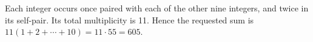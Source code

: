 Each integer occurs once paired with each of the other nine integers, and twice in its self-pair. Its total multiplicity is 11. Hence the requested sum is $ 11(1+2+\cdots+10)=11\cdot55=\boxed{605}$.
